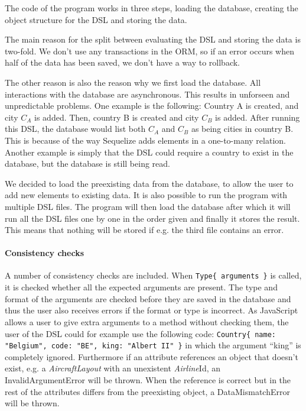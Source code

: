 \documentclass[a4paper,11pt]{article}
\newcommand{\npar}{\par \vspace{2.3ex plus 0.3ex minus 0.3ex} \noindent}
\newcommand{\dslcode}[1]{\texttt{#1}}
\newcommand{\dsltype}[1]{\textit{#1}}
\begin{document}
\npar The code of the program works in three steps, loading the database, creating the object structure for the DSL and storing the data.
\par The main reason for the split between evaluating the DSL and storing the data is two-fold. We don't use any transactions in the ORM, so if an error occurs when half of the data has been saved, we don't have a way to rollback.
\par The other reason is also the reason why we first load the database. All interactions with the database are asynchronous. This results in unforseen and unpredictable problems. One example is the following: Country A is created, and city \(C_A\) is added. Then, country B is created and city \(C_B\) is added. After running this DSL, the database would list both \(C_A\) and \(C_B\) as being cities in country B. This is because of the way Sequelize adds elements in a one-to-many relation. Another example is simply that the DSL could require a country to exist in the database, but the database is still being read.

\npar We decided to load the preexisting data from the database, to allow the user to add new elements to existing data. It is also possible to run the program with multiple DSL files. The program will then load the database after which it will run all the DSL files one by one in the order given and finally it stores the result. This means that nothing will be stored if e.g. the third file contains an error.

\paragraph*{Consistency checks} A number of consistency checks are included. When \dslcode{Type\{ arguments \}} is called, it is checked whether all the expected arguments are present. The type and format of the arguments are checked before they are saved in the database and thus the user also receives errors if the format or type is incorrect. As JavaScript allows a user to give extra arguments to a method without checking them, the user of the DSL could for example use the following code: \dslcode{Country\{ name: "Belgium", code: "BE", king: "Albert II" \}} in which the argument ``king'' is completely ignored.
Furthermore if an attribute references an object that doesn't exist, e.g. a \dsltype{AircraftLayout} with an unexistent \dsltype{Airline}Id, an InvalidArgumentError will be thrown. When the reference is correct but in the rest of the attributes differs from the preexisting object, a DataMismatchError will be thrown.
\end{document}
